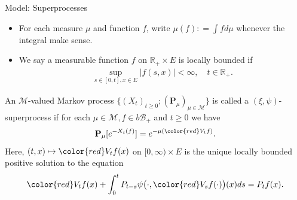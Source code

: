 \documentclass[xcolor=dvipsnames]{beamer}
\begin{document}
\begin{frame}{Model: Superprocesses}
\begin{itemize}
\item
For each measure $\mu$ and function $f$, write
$\mu(f) : = \int f d\mu$ whenever the integral make sense.
\item
We say a measurable function $f$ on $\mathbb R_+ \times E$ is {\color{blue} locally bounded} if
\begin{align}
\sup_{s\in [0,t], x\in E} |f(s,x)| < \infty, \quad t\in \mathbb R_+.
\end{align}
\end{itemize}
\begin{definition}[Superprocesses]
An $\mathcal M$-valued Markov process {\color{red} $\{(X_t)_{t\geq 0}; (\mathbf P_\mu)_{\mu\in \mathcal M}\}$} is called a $(\xi,\psi)$-superprocess if for each $\mu \in \mathcal M, f\in b\mathscr B_+$ and $t\geq 0$ we have
\[
  \mathbf P_\mu [e^{-X_t(f)}] = e^{-\mu( {\color{red} V_tf} )}.
\]
Here, $(t,x) \mapsto {\color{red} V_tf(x)}$ on $[0,\infty) \times E$ is the unique {\color{blue} locally bounded} positive solution to the equation
\begin{align*}\label{eq:FKPP_in_definition}
  {\color{red} V_tf(x)} + \int_0^{t} P_{t-s} \psi \big(\cdot, {\color{red} V_sf(\cdot)}\big) (x) ds 
  = P_t f(x).
\end{align*}
\end{definition}
\end{frame}

\end{document}
